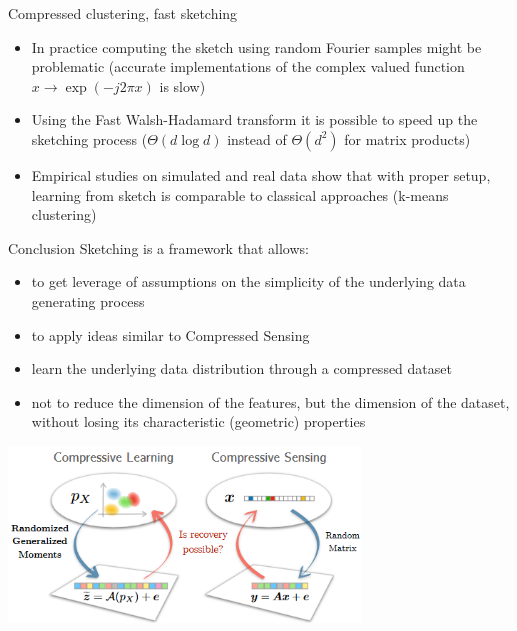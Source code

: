 \documentclass{beamer}
\begin{document}
\begin{frame}{Compressed clustering, fast sketching}
\begin{itemize}
    \item In practice computing the sketch using random Fourier samples might be problematic (accurate implementations of the complex valued function $x\rightarrow\exp(-j2\pi x)$ is slow)
    \item Using the Fast Walsh-Hadamard transform it is possible to speed up the sketching process ($\Theta(d\log d)$ instead of $\Theta(d^2)$ for matrix products)  
    \item Empirical studies on simulated and real data show that with proper setup, learning from sketch is comparable to classical approaches (k-means clustering) 
\end{itemize}
\end{frame}

\begin{frame}{Conclusion}
	Sketching is a framework that allows:
	\begin{itemize}
		\item to get leverage of assumptions on the simplicity of the underlying data generating process
		\item to apply ideas similar to Compressed Sensing
		\item learn the underlying data distribution through a compressed dataset
		\item not to reduce the dimension of the features, but the dimension of the dataset, without losing its characteristic (geometric) properties
	\end{itemize}
	\center
	\includegraphics[height=0.4\textheight, width=0.7\textwidth]{CS}
\end{frame}
\end{document}
